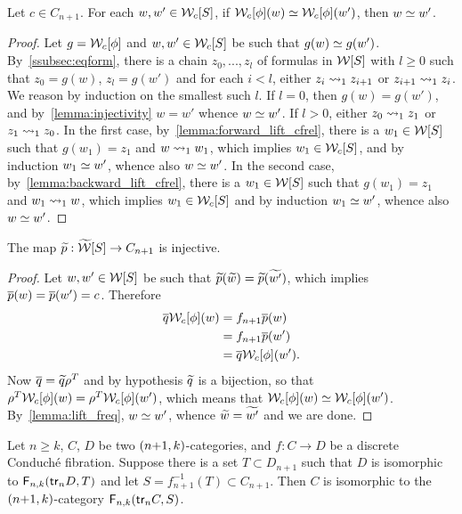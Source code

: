  \begin{lemma}\label{lemma:lift_freq}
 Let $c\in C_{n+1}$. For each $w,w'\in\mathcal{W}_{c}[S]$, if $\mathcal{W}_{c}[\phi](w)\simeq \mathcal{W}_{c}[\phi] (w')$, then $w\simeq w'$.
\end{lemma}
\begin{proof}
  Let $g=\mathcal{W}_{c}[\phi]$ and $w,w'\in\mathcal{W}_{c}[S]$ be such that $g(w)\simeq
  g(w')$. By~\ref{ssubsec:eqform}, there is a chain $z_0,...,z_l$ of
  formulas in $\mathcal{W}[S]$ with $l\geq 0$ such that $z_0=g(w)$, $z_l=g(w')$ and for each
  $i<l$, either $z_i\leadsto_1 z_{i+1}$ or $z_{i+1}\leadsto_1 z_i$. We reason
  by induction on the smallest such $l$. If $l=0$, then $g(w)=g(w')$,
  and by~\cref{lemma:injectivity} $w=w'$ whence $w\simeq w'$. If
  $l>0$, either $z_0\leadsto_1 z_1$ or $z_1\leadsto_1 z_0$. In the first case,
  by~\cref{lemma:forward_lift_cfrel}, there is a $w_1\in\mathcal{W}[S]$ such
  that $g(w_1)=z_1$ and $w\leadsto_1 w_1$, which implies $w_1\in\mathcal{W}_{c}[S]$,
  and by induction $w_1\simeq w'$, whence also $w\simeq w'$. In the
  second case, by~\cref{lemma:backward_lift_cfrel}, there is a
  $w_1\in\mathcal{W}[S]$ such that $g(w_1)=z_1$ and $w_1\leadsto_1 w$, which
  implies $w_1\in\mathcal{W}_{c}[S]$ and by induction $w_1\simeq w'$, whence also
  $w\simeq w'$. 
\end{proof}
\begin{lemma}\label{lemma:inj}
 The map $\widetilde{p}:\widetilde{\mathcal{W}}[S]\to
 C_{n+1}$ is injective.
\end{lemma}
\begin{proof}
  Let $w,w'\in\mathcal{W}[S]$ be such that $\widetilde{p}(\widetilde{w})=\widetilde{p}(\widetilde{w'})$, which implies $\overline{p}(w)=\overline{p}(w')=c$. Therefore
  \begin{align*}
    \overline{q}\mathcal{W}_{c}[\phi](w) & = f_{n+1}\overline{p}(w)\\
                         & = f_{n+1}\overline{p}(w')\\
                         & = \overline{q}\mathcal{W}_{c}[\phi](w').
  \end{align*}
  Now $\overline{q}=\widetilde{q}\rho^{T}$ and by hypothesis $\widetilde{q}$ is a
  bijection, so that $\rho^{T}\mathcal{W}_{c}[\phi](w)=\rho^{T}\mathcal{W}_{c}[\phi](w')$, which
  means that $\mathcal{W}_{c}[\phi](w)\simeq \mathcal{W}_{c}[\phi](w')$. By~\cref{lemma:lift_freq}, $w\simeq w'$, whence $\widetilde{w}=\widetilde{w'}$ and we are done. \end{proof}
\begin{proposition}\label{prop:sum_up}
  Let $n\geq k$, $C$, $D$ be two $(n{+}1,k)$-categories, and $f:C\to D$ be a
  discrete Conduché fibration. Suppose there is a set $T\subset D_{n+1}$ such
  that $D$ is isomorphic to $\mathsf{F}_{n,k}(\mathsf{tr}_{n}D,T)$ and  let
  $S=f_{n+1}^{-1}(T)\subset C_{n+1}$. Then $C$ is isomorphic to the
  $(n{+}1,k)$-category $\mathsf{F}_{n,k}(\mathsf{tr}_{n}C,S)$.
\end{proposition}
